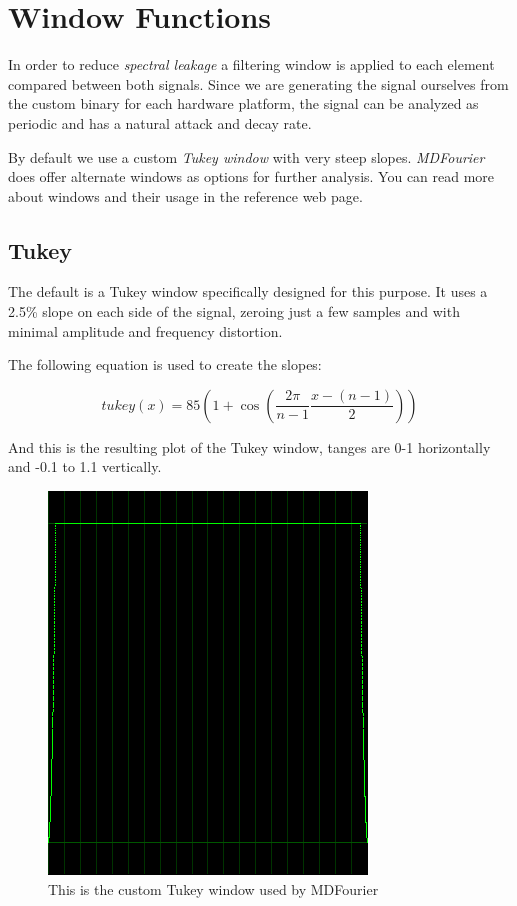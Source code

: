 \documentclass[10pt,a4paper]{report}
\begin{document}
\section{Window Functions}
\label{windows}

In order to reduce \textit{spectral leakage} a filtering window is applied to each element compared between both signals. Since we are generating the signal ourselves from the custom binary for each hardware platform, the signal can be analyzed as periodic and has a natural attack and decay rate.

By default we use a custom \textit{Tukey window} with very steep slopes. \textit{MDFourier} does offer alternate windows as options for further analysis. You can read more about windows and their usage in the reference web page\cite{windowtypes}.

\subsection{Tukey}

The default is a Tukey window specifically designed for this purpose. It uses a 2.5\% slope on each side of the signal, zeroing just a few samples and with minimal amplitude and frequency distortion.

The following equation is used to create the slopes:

\begin{equation}
tukey(x)=85(1+\cos(\frac{2\pi}{n-1}\frac{x-(n-1)}{2}))
\end{equation}

And this is the resulting plot of the Tukey window, tanges are 0-1 horizontally and -0.1 to 1.1 vertically.

\begin{figure}[H]
	\centering
	\includegraphics[width=0.4\linewidth]{plots/window-tukey.png}
	\caption[Tukey Window]{This is the custom Tukey window used by MDFourier}
	\label{fig:window-tukey}
\end{figure}
\end{document}
